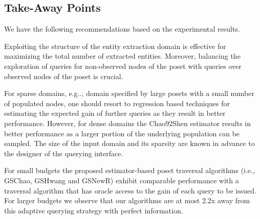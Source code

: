 \subsection{Take-Away Points}
We have the following recommendations based on the experimental results.
\squishlist
\item Exploiting the structure of the entity extraction domain is effective for maximizing the total number of extracted entities. Moreover, balancing the exploration of queries for non-observed nodes of the poset with queries over observed nodes of the poset is crucial.
\item For sparse domains, e.g.., domain specified by large posets with a small number of populated nodes, one should resort to regression based techniques for estimating the expected gain of further queries as they result in better performance. However, for dense domains the Chao92Shen estimator results in better performance as a larger portion of the underlying population can be sampled. The size of the input domain and its sparsity are known in advance to the designer of the querying interface. 
\item For small budgets the proposed estimator-based poset traversal algorithms (i.e., GSChao, GSHwang and GSNewR) exhibit comparable performance with a traversal algorithm that has oracle access to the gain of each query to be issued. For larger budgets we observe that our algorithms are at most 2.2x away from this adaptive querying strategy with perfect information.
\squishend